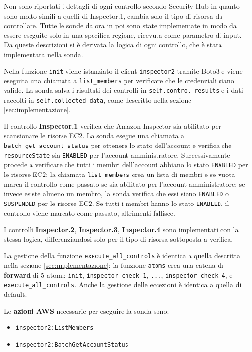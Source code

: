 Non sono riportati i dettagli di ogni controllo secondo Security Hub in quanto sono molto simili a quelli di Inspector.1, cambia solo il tipo di risorsa da controllare. Tutte le sonde da ora in poi sono state implementate in modo da essere eseguite solo in una specifica regione, ricevuta come parametro di input. Da queste descrizioni si è derivata la logica di ogni controllo, che è stata implementata nella sonda.


Nella funzione \texttt{init} viene istanziato il client \texttt{inspector2} tramite Boto3 e viene eseguita una chiamata a \texttt{list\_members} per verificare che le credenziali siano valide. La sonda salva i risultati dei controlli in \texttt{self.control\_results} e i dati raccolti in \texttt{self.collected\_data}, come descritto nella sezione \ref{sec:implementazione}. 

Il controllo \textbf{Inspector.1} verifica che Amazon Inspector sia abilitato per scansionare le risorse EC2. La sonda esegue una chiamata a \texttt{batch\_get\_account\_status} per ottenere lo stato dell'account e verifica che \texttt{resourceState} sia \texttt{ENABLED} per l'account amministratore. Successivamente procede a verificare che tutti i membri dell'account abbiano lo stato \texttt{ENABLED} per le risorse EC2: la chiamata \texttt{list\_members} crea un lista di membri e se vuota marca il controllo come passato se sia abilitato per l'account amministratore; se invece esiste almeno un membro, la sonda verifica che essi siano \texttt{ENABLED} o \texttt{SUSPENDED} per le risorse EC2. Se tutti i membri hanno lo stato \texttt{ENABLED}, il controllo viene marcato come passato, altrimenti fallisce.

I controlli \textbf{Inspector.2}, \textbf{Inspector.3}, \textbf{Inspector.4} sono implementati con la stessa logica, differenziandosi solo per il tipo di risorsa sottoposta a verifica.

La gestione della funzione \texttt{execute\_all\_controls} è identica a quella descritta nella sezione \ref{sec:implementazione}: la funzione \texttt{atoms} crea una catena di \textbf{forward} di 5 atomi: \texttt{init}, \texttt{inspector\_check\_1}, \texttt{...}, \texttt{inspector\_check\_4}, e \texttt{execute\_all\_controls}. Anche la gestione delle eccezioni è identica a quella di default. 

Le \textbf{azioni AWS} necessarie per eseguire la sonda sono:

\begin{itemize}
    \item \texttt{inspector2:ListMembers}
    \item \texttt{inspector2:BatchGetAccountStatus}
\end{itemize}

